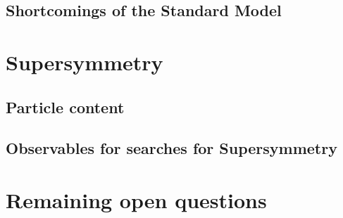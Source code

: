 \subsection{Shortcomings of the Standard Model}
\label{sub:sm_shorts}

\section{Supersymmetry}
\label{sec:susy}

\subsection{Particle content}
\label{sub:susy_particles}

\subsection{Observables for searches for Supersymmetry}
\label{sub:susy_observables}

\section{Remaining open questions}
\label{sec:theory_remains}
